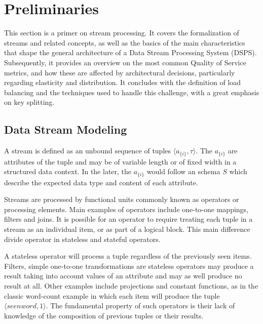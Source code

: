\chapter{Preliminaries
  \label{chapter:preliminaries}}

  This section is a primer on stream processing. It covers the formalization of
  streams and related concepts, as well as the basics of the main
  characteristics that shape the general architecture of a Data Stream
  Processing System (DSPS). Subsequently, it provides an overview on the most
  common Quality of Service metrics, and how these are affected by
  architectural decisions, particularly regarding elasticity and distribution.
  It concludes with the definition of load balancing and the techniques used to
  handle this challenge, with a great emphasis on key splitting.

  \section{Data Stream Modeling}

  A stream is defined as an unbound sequence of tuples $\langle
  a_{\{i\}},\tau\rangle$. The $a_{\{i\}}$ are attributes of the tuple and may
  be of variable length or of fixed width in a structured data context. In the
  later, the $a_{\{i\}}$ would follow an schema $S$ which describe the expected
  data type and  content of each attribute.

  Streams are processed by functional units commonly known as operators or
  processing elements. Main examples of operators include one-to-one mappings,
  filters and joins. It is possible for an operator to require treating each
  tuple in a stream as an individual item, or as part of a logical block. This
  main difference divide operator in stateless and stateful operators.

  A stateless operator will process a tuple regardless of the previously seen
  items. Filters, simple one-to-one transformations are stateless operators may
  produce a result taking into account values of an attribute and may as well
  produce no result at all. Other examples include projections and constant
  functions, as in the classic word-count example in which each item will
  produce the tuple $\langle seenword, 1\rangle$. The fundamental property of
  such operators is their lack of knowledge of the composition of previous
  tuples or their results.

